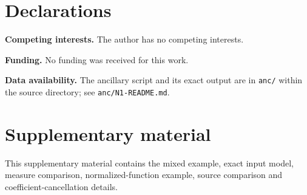 \documentclass{amsart}
\begin{document}
\section*{Declarations}

\textbf{Competing interests.} The author has no competing interests.

\textbf{Funding.} No funding was received for this work.

\textbf{Data availability.} The ancillary script and its exact output are in
\texttt{anc/} within the source directory; see \texttt{anc/N1-README.md}.

\label{page:body-end}
\clearpage
\appendix
\label{page:appendix-start}





\label{page:appendix-end}
\clearpage
\section*{Supplementary material}
\setcounter{section}{0}
\renewcommand{\thesection}{S\arabic{section}}
\renewcommand{\theHsection}{supplement.\arabic{section}}
This supplementary material contains the mixed example, exact input model,
measure comparison, normalized-function example, source comparison and
coefficient-cancellation details.






\clearpage

\label{page:references-start}

\label{page:references-end}
\label{page:main-end}
\end{document}
